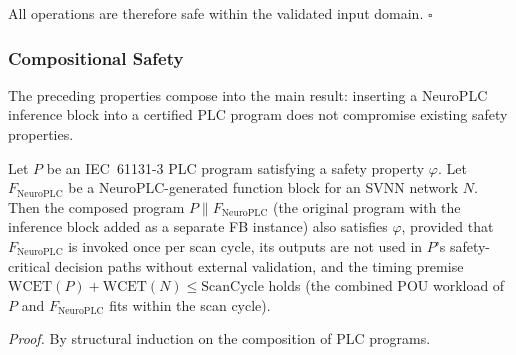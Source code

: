 All operations are therefore safe within the validated input domain.
$\square$

\subsubsection{Compositional Safety}

The preceding properties compose into the main result: inserting a
NeuroPLC inference block into a certified PLC program does not
compromise existing safety properties.

\vspace{4pt}
\begin{kingthm}
\label{thm:noninterference}
Let $P$ be an IEC~61131-3 PLC program satisfying a safety property
$\varphi$. Let $F_{\text{NeuroPLC}}$ be a NeuroPLC-generated function
block for an SVNN network $N$. Then the composed program
$P \parallel F_{\text{NeuroPLC}}$ (the original program with the
inference block added as a separate FB instance) also satisfies
$\varphi$, provided that $F_{\text{NeuroPLC}}$ is invoked once per
scan cycle, its outputs are not used in $P$'s safety-critical
decision paths without external validation, and the timing premise
$\text{WCET}(P) + \text{WCET}(N) \leq \text{ScanCycle}$ holds (the
combined POU workload of $P$ and $F_{\text{NeuroPLC}}$ fits within
the scan cycle).
\end{kingthm}

\vspace{2pt}
\noindent\textit{Proof.}
By structural induction on the composition of PLC programs.

